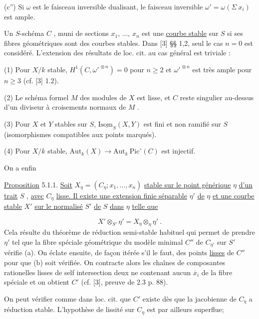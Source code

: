 (c'')  Si  $\omega$  est le faisceau inversible dualisant, le faisceau inversible $\omega' = \omega(\Sigma\ x_i)$  est ample.

Un  $S$-schéma  $C$ , muni de sections  $x_1$, ...,  $x_n$  est une \underline{courbe stable}  sur $S$  si ses fibres géométriques sont des courbes stables. Dans [3] §§ 1,2, seul le cas $n = 0$  est considéré. L'extension des résultats de loc. cit. au cas général est triviale :

(1) Pour  $X/k$  stable,  $H^1(C,\omega'^{\,\otimes n}) = 0$  pour  $n \geqslant 2$  et  $\omega'^{\,\otimes n}$  est très ample pour  $n \geqslant 3$  (cf. [3] 1.2).

(2) Le schéma formel  $M$  des modules de  $X$  est lisse, et  $C$  reste singulier au-dessus d'un diviseur à croisements normaux de  $M$ .



(3) Pour  $X$  et  $Y$  stables sur  $S$, $\mathrm{I}\underline{\mathrm{som}}_{S}(X,Y)$  est fini et non ramifié sur $S$  (isomorphismes compatibles aux points marqués).

(4) Pour  $X/k$  stable,  $\mathrm{Aut}_k(X) \longrightarrow \mathrm{Aut}_k\ \mathrm{Pic}^{\circ}(C)$  est injectif.

On a enfin

\underline{Proposition} 5.1.1.  \underline{Soit}  $X_\eta = (C_\eta ; x_1, \ldots, x_n)$  \underline{stable sur le point générique}  $\eta$ \underline{d'un trait}  $S$ , \underline{avec}  $C_\eta$  \underline{lisse. Il existe une extension finie séparable}  $\eta'$  \underline{de}  $\eta$ \underline{et une courbe stable}  $X'$  \underline{sur le normalisé}  $S'$  \underline{de}  $S$  \underline{dans}  $\eta$  \underline{telle que}

\begin{equation*}
X' \otimes_{S'} \eta' = X_{\eta} \otimes_{\eta} \eta' \ .
\end{equation*}
Cela résulte du théorème de réduction semi-stable habituel qui permet de prendre  $\eta'$  tel que la fibre spéciale géométrique du modèle minimal  $C''$  de  $C_{\eta'}$ sur  $S'$  vérifie (a). On éclate ensuite, de façon itérée s'il le faut, des points \underline{lisses} de  $C''$  pour que  (b) soit vérifiée. On contracte alors les chaînes de composantes rationelles lisses de self intersection deux ne contenant aucun  $\overline{x}_i$  de la fibre spéciale et on obtient  $C'$  (cf. [3], preuve de 2.3 p. 88).

On peut vérifier comme dans loc. cit. que  $C'$  existe dès que la jacobienne de  $C_\eta$  a réduction stable. L'hypothèse de lissité sur  $C_\eta$  est par ailleurs superflue;

